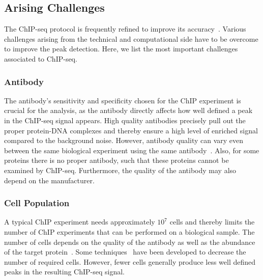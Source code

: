 \subsection{Arising Challenges}
\label{sec_chipseq_challenges}
The ChIP-seq protocol is frequently refined to improve its accuracy~\citep{Meyer2014}.
Various challenges arising from the technical and computational side have to be overcome to improve the peak detection.
Here, we list the most important challenges associated to ChIP-seq.


\subsubsection{Antibody}
\label{sec_challenges_antibody}
The antibody's sensitivity and specificity chosen for the ChIP experiment is crucial for the analysis, as the antibody directly affects how well defined a peak in the ChIP-seq signal appears. 
High quality antibodies precisely pull out the proper protein-DNA complexes and thereby ensure a high level of enriched signal compared to the background noise. 
However, antibody quality can vary even between the same biological experiment using the same antibody~\citep{park2009, Furey2012}.
Also, for some proteins there is no proper antibody, such that these proteins cannot be examined by ChIP-seq.
Furthermore, the quality of the antibody may also depend on the manufacturer. 

\subsubsection{Cell Population}
\label{sec_challenges_cell_population}
A typical ChIP experiment needs approximately $10^7$ cells and thereby limits the number of ChIP experiments that can be performed on a biological sample.
The number of cells depends on the quality of the antibody as well as the abundance of the target protein~\citep{Furey2012}.
Some techniques~\citep{Acevedo2007, Adli2011} have been developed to decrease the number of required cells.
However, fewer cells generally produce less well defined peaks in the resulting ChIP-seq signal.

